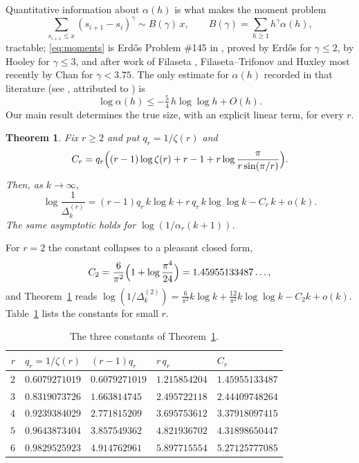 \documentclass[11pt,reqno]{amsart}
\theoremstyle{plain}
\newtheorem{theorem}{Theorem}[section]
\theoremstyle{definition}
\numberwithin{equation}{section}
\begin{document}
Quantitative information about $\alpha(h)$ is what makes the moment problem
\begin{equation}\label{eq:moments}
  \sum_{s_{i+1}\le x}(s_{i+1}-s_i)^{\gamma}\sim B(\gamma)\,x,
  \qquad B(\gamma)=\sum_{h\ge1}h^{\gamma}\alpha(h),
\end{equation}
tractable; \eqref{eq:moments} is Erd\H{o}s Problem \#145 in \cite{Bloom}, proved by
Erd\H{o}s \cite{Erdos1951} for $\gamma\le2$, by Hooley \cite{Hooley} for $\gamma\le3$, and
after work of Filaseta \cite{Filaseta1993}, Filaseta--Trifonov \cite{FT1996} and Huxley
\cite{Huxley1997,Huxley2000} most recently by Chan \cite{Chan} for $\gamma<3.75$. The only
estimate for $\alpha(h)$ recorded in that literature (see \cite[(2)]{Chan}, attributed to
\cite[Lemma~1]{Huxley1997}) is
\begin{equation}\label{eq:huxley-lemma}
  \log\alpha(h)\le-\tfrac54\,h\log\log h+O(h).
\end{equation}
Our main result determines the true size, with an explicit linear term, for every $r$.

\begin{theorem}\label{thm:main}
Fix $r\ge2$ and put $q_r=1/\zeta(r)$ and
\begin{equation}\label{eq:Cr}
  C_r=q_r\Bigl((r-1)\log\zeta(r)+r-1+r\log\frac{\pi}{r\sin(\pi/r)}\Bigr).
\end{equation}
Then, as $k\to\infty$,
\[
  \log\frac1{\Delta^{(r)}_k}
  =(r-1)q_r\,k\log k+r\,q_r\,k\log\log k-C_r\,k+o(k).
\]
The same asymptotic holds for $\log(1/\alpha_r(k+1))$.
\end{theorem}

For $r=2$ the constant collapses to a pleasant closed form,
\begin{equation}\label{eq:C2}
  C_2=\frac{6}{\pi^{2}}\Bigl(1+\log\frac{\pi^{4}}{24}\Bigr)=1.45955133487\ldots,
\end{equation}
and Theorem~\ref{thm:main} reads
$\log(1/\Delta^{(2)}_k)=\frac{6}{\pi^{2}}k\log k+\frac{12}{\pi^{2}}k\log\log k-C_2k+o(k)$.
Table~\ref{tab:Cr} lists the constants for small $r$.

\begin{table}[ht]
\caption{The three constants of Theorem~\ref{thm:main}.}
\label{tab:Cr}
\begin{tabular}{rllll}
\toprule
$r$ & $q_r=1/\zeta(r)$ & $(r-1)q_r$ & $r\,q_r$ & $C_r$\\
\midrule
$2$ & $0.6079271019$ & $0.6079271019$ & $1.215854204$ & $1.45955133487$\\
$3$ & $0.8319073726$ & $1.663814745$ & $2.495722118$ & $2.44409748264$\\
$4$ & $0.9239384029$ & $2.771815209$ & $3.695753612$ & $3.37918097415$\\
$5$ & $0.9643873404$ & $3.857549362$ & $4.821936702$ & $4.31898650447$\\
$6$ & $0.9829525923$ & $4.914762961$ & $5.897715554$ & $5.27125777085$\\
\bottomrule
\end{tabular}
\end{table}
\end{document}
